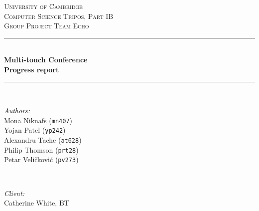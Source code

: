 \documentclass[12p, a4paper, onecolumn]{report}
\begin{document}
\begin{titlepage}

\newcommand{\HRule}{\rule{\linewidth}{0.5mm}} %
\clearpage
\vspace*{\fill}
\center %
 

\textsc{\LARGE University of Cambridge}\\[1.5cm] %
\textsc{\Large Computer Science Tripos, Part IB}\\[0.5cm] %
\textsc{\large Group Project Team Echo}\\[0.5cm] %


\HRule \\[0.4cm]
{ \huge \bfseries Multi-touch Conference}\\[0.4cm]
{ \huge \bfseries Progress report}\\[0.1cm] %
\HRule \\[1.5cm]
 

\begin{minipage}{0.4\textwidth}
\begin{flushleft} \large
\emph{Authors:}\\
Mona Niknafs (\texttt{mn407})\\
Yojan Patel (\texttt{yp242})\\
Alexandru Tache (\texttt{at628})\\
Philip Thomson (\texttt{prt28})\\
Petar Veli\v{c}kovi\'{c} (\texttt{pv273})\\
\end{flushleft}
\end{minipage}
~
\begin{minipage}{0.4\textwidth}
\begin{flushright} \large
\emph{Client:} \\
Catherine White, BT\\ 
\hfill \\
\hfill \\
\hfill \\
\hfill \\
\end{flushright}
\end{minipage}\\[4cm]


\end{titlepage}
\end{document}
